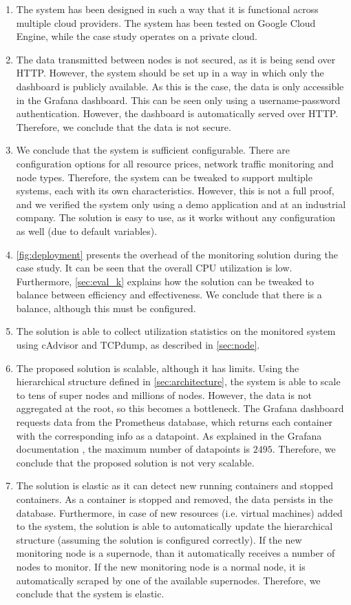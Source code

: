 \begin{enumerate}
    \item The system has been designed in such a way that it is functional across multiple cloud providers. The system has been tested on Google Cloud Engine, while the case study operates on a private cloud.
    \item The data transmitted between nodes is not secured, as it is being send over HTTP. However, the system should be set up in a way in which only the dashboard is publicly available. As this is the case, the data is only accessible in the Grafana dashboard. This can be seen only using a username-password authentication. However, the dashboard is automatically served over HTTP. Therefore, we conclude that the data is not secure.
    \item We conclude that the system is sufficient configurable. There are configuration options for all resource prices, network traffic monitoring and node types. Therefore, the system can be tweaked to support multiple systems, each with its own characteristics. However, this is not a full proof, and we verified the system only using a demo application and at an industrial company. The solution is easy to use, as it works without any configuration as well (due to default variables).
    \item \autoref{fig:deployment} presents the overhead of the monitoring solution during the case study. It can be seen that the overall CPU utilization is low. Furthermore, \autoref{sec:eval_k} explains how the solution can be tweaked to balance between efficiency and effectiveness. We conclude that there is a balance, although this must be configured.
    \item The solution is able to collect utilization statistics on the monitored system using cAdvisor and TCPdump, as described in \autoref{sec:node}.
    \item The proposed solution is scalable, although it has limits. Using the hierarchical structure defined in \autoref{sec:architecture}, the system is able to scale to tens of super nodes and millions of nodes.
    However, the data is not aggregated at the root, so this becomes a bottleneck. The Grafana dashboard requests data from the Prometheus database, which returns each container with the corresponding info as a datapoint. As explained in the Grafana documentation \cite{grafana}, the maximum number of datapoints is $2495$. Therefore, we conclude that the proposed solution is not very scalable.
    \item The solution is elastic as it can detect new running containers and stopped containers. As a container is stopped and removed, the data persists in the database. Furthermore, in case of new resources (i.e. virtual machines) added to the system, the solution is able to automatically update the hierarchical structure (assuming the solution is configured correctly). If the new monitoring node is a supernode, than it automatically receives a number of nodes to monitor. If the new monitoring node is a normal node, it is automatically scraped by one of the available supernodes. Therefore, we conclude that the system is elastic.

\end{enumerate}
